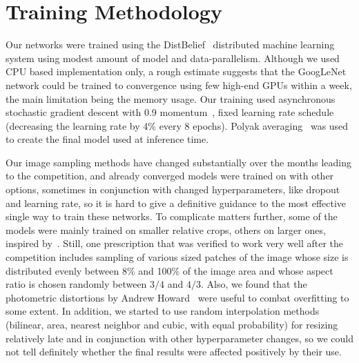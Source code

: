 \section{Training Methodology}

Our networks were trained using the DistBelief~\cite{dean2012large} distributed machine learning system using modest amount of model and data-parallelism. Although we used CPU based implementation only, a rough estimate suggests that the GoogLeNet network could be trained to convergence using few high-end GPUs within a week, the main limitation being the memory usage. Our training used asynchronous stochastic gradient descent with 0.9 momentum~\cite{sutskever2013momentum}, fixed learning rate schedule (decreasing the learning rate by 4\% every 8 epochs). Polyak averaging~\cite{polyak1992} was used to create the final model used at inference time.

  Our image sampling methods have changed substantially over the months leading to the competition, and already converged models were trained on with other options, sometimes in conjunction with changed hyperparameters, like dropout and learning rate, so it is hard to give a definitive guidance to the most effective single way to train these networks. To complicate matters further, some of the models were mainly trained on smaller relative crops, others on larger ones, inspired by~\cite{howard2013improvements}. Still, one prescription that was verified to work very well after the competition includes sampling of various sized patches of the image whose size is distributed evenly between 8\% and 100\% of the image area and whose aspect ratio is chosen randomly between $3/4$ and $4/3$. Also, we found that the photometric distortions by Andrew Howard~\cite{howard2013improvements} were useful to combat overfitting to some extent. In addition, we started to use random interpolation methods (bilinear, area, nearest neighbor and cubic, with equal probability) for resizing relatively late and in conjunction with other hyperparameter changes, so we could not tell definitely whether the final results were affected positively by their use.
